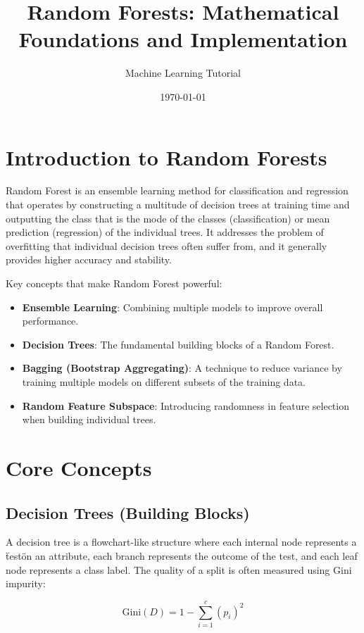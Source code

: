 \documentclass[12pt,a4paper]{article}
\title{Random Forests: Mathematical Foundations and Implementation}
\author{Machine Learning Tutorial}
\date{\today}
\begin{document}
\maketitle

\tableofcontents
\newpage

\section{Introduction to Random Forests}

Random Forest is an ensemble learning method for classification and regression that operates by constructing a multitude of decision trees at training time and outputting the class that is the mode of the classes (classification) or mean prediction (regression) of the individual trees. It addresses the problem of overfitting that individual decision trees often suffer from, and it generally provides higher accuracy and stability.

Key concepts that make Random Forest powerful:
\begin{itemize}
    \item \textbf{Ensemble Learning}: Combining multiple models to improve overall performance.
    \item \textbf{Decision Trees}: The fundamental building blocks of a Random Forest.
    \item \textbf{Bagging (Bootstrap Aggregating)}: A technique to reduce variance by training multiple models on different subsets of the training data.
    \item \textbf{Random Feature Subspace}: Introducing randomness in feature selection when building individual trees.
\end{itemize}

\section{Core Concepts}

\subsection{Decision Trees (Building Blocks)}

A decision tree is a flowchart-like structure where each internal node represents a \"test\" on an attribute, each branch represents the outcome of the test, and each leaf node represents a class label. The quality of a split is often measured using Gini impurity:

\begin{equation}
\text{Gini}(D) = 1 - \sum_{i=1}^{c} (p_i)^2
\end{equation}
\end{document}
